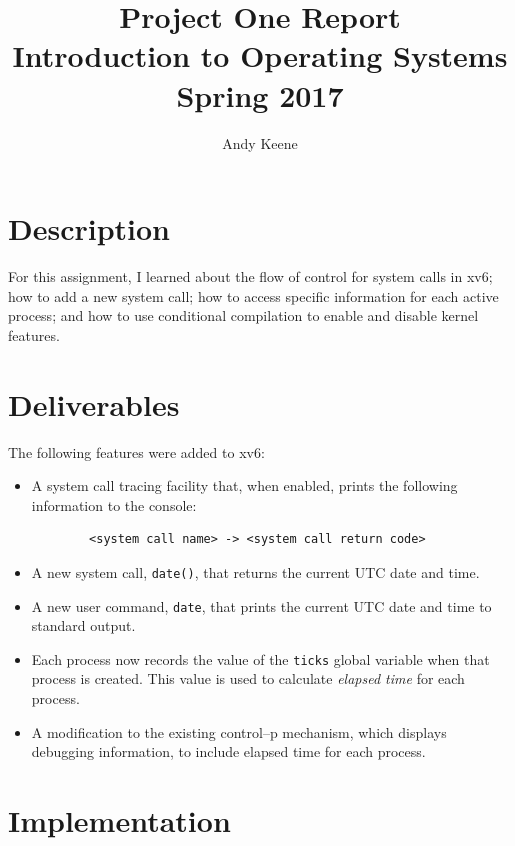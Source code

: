 \documentclass[11pt,letterpaper]{report}
\author{Andy Keene}
\title{Project One Report\\Introduction to Operating Systems\\ Spring 2017}
\date{}
\begin{document}
	\maketitle
	

	\section*{Description}
	For this assignment, I learned about the flow of control for system calls in xv6; how to add a new system call; how to access specific information for each active process; and how to use conditional compilation to enable and disable kernel features. \\
		
	\section*{Deliverables}
	The following features were added to xv6:
	
	\begin{itemize}
	
	\item A system call tracing facility that, when enabled, prints the following information to the console:
	\begin{verbatim}
		<system call name> -> <system call return code>
	\end{verbatim}
	
	
	\item A new system call, {\tt date()}, that returns the current UTC date and time. %
	
	\item A new user command, {\tt date}, that prints  the current UTC date and time to standard output.
	
	\item Each process now records the value of the {\tt ticks} global variable when that process is created. This value is used to calculate \emph{elapsed time} for each process.
	
	\item A modification to the existing control--p mechanism, which displays debugging information, to  include  elapsed time for each process.
	
	\end{itemize}
	
\newpage	
	\section*{Implementation}
	
\end{document}
